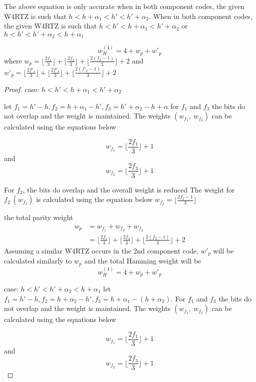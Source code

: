 The above equation is only accurate when in both component codes, the given W4RTZ is such that $h<h+\alpha_1<h'<h'+\alpha_2$. When in both component codes,  the given W4RTZ is such that $h<h'<h+\alpha_1<h'+\alpha_2$ or $h<h'<h'+\alpha_2<h+\alpha_1$

\begin{equation}
w_H^{(4)}=4+w_p+w'_p
\end{equation}
where $w_p=\lfloor \frac{2f_1}{3} \rfloor + \lfloor \frac{2f_3}{3} \rfloor+\lfloor \frac{2(f_2-1)}{3} \rfloor + 2$ and \newline
$w'_p=\lfloor \frac{2f'_1}{3} \rfloor + \lfloor \frac{2f'_3}{3} \rfloor+\lfloor \frac{2(f'_2-1)}{3} \rfloor + 2$

\begin{proof}{case: $h<h'<h+\alpha_1<h'+\alpha_2$}

let $f_1 = h' - h, f_2= h+\alpha_1 - h', f_3 = h'+\alpha_2 - h+\alpha$
for $f_1$ and $f_3$ the bits do not overlap and the weight is maintained. The weights $(w_{f_1},~w_{f_3})$ can be calculated
using the equations below

$$w_{f_1}=\lfloor \frac{2f_1}{3} \rfloor+1$$
and
$$w_{f_3}=\lfloor \frac{2f_3}{3} \rfloor+1$$

For $f_2$, the bits do overlap and the overall weight is reduced
The weight for $f_2~ (w_{f_2})$ is calculated using the equation below
$w_{f_2}=\lfloor \frac{2f_2-1}{3} \rfloor$

the total parity weight 
\begin{equation}
\begin{split}
w_p &= w_{f_1} + w_{f_2} + w_{f_2}\\
&= \lfloor \frac{2f_1}{3} \rfloor + \lfloor \frac{2f_3}{3} \rfloor+\lfloor \frac{2(f_2-1)}{3} \rfloor + 2
\end{split}
\end{equation}
Assuming a similar W4RTZ occurs in the 2nd component code, $w'_p$ will be calculated similarly to $w_p$ and the total Hamming weight will be 
\begin{equation}
w_H^{(4)}=4+w_p+w'_p
\end{equation}

{case: $h<h'<h'+\alpha_2<h+\alpha_1$}
let $f_1 = h' - h, f_2= h+\alpha_2 - h', f_3 = h+\alpha_1 - (h+\alpha_2)$.
For $f_1$ and $f_3$ the bits do not overlap and the weight is maintained. The weights $(w_{f_1},~w_{f_3})$ can be calculated
using the equations below

$$w_{f_1}=\lfloor \frac{2f_1}{3} \rfloor+1$$
and 
$$w_{f_3}=\lfloor \frac{2f_3}{3} \rfloor+1$$


\end{proof}
